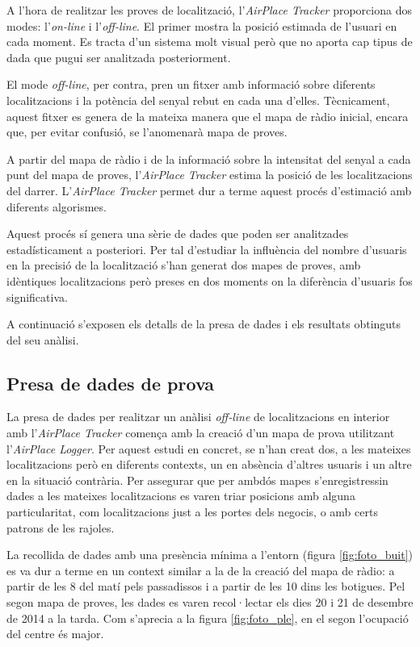 
A l'hora de realitzar les proves de localització, l'\textit{AirPlace Tracker} proporciona dos modes: l'\textit{on-line} i l'\textit{off-line}. El primer mostra la posició estimada de l'usuari en cada moment. Es tracta d'un sistema molt visual però que no aporta cap tipus de dada que pugui ser analitzada posteriorment.

El mode \textit{off-line}, per contra, pren un fitxer amb informació sobre diferents localitzacions i la potència del senyal rebut en cada una d'elles. Tècnicament, aquest fitxer es genera de la mateixa manera que el mapa de ràdio inicial, encara que, per evitar confusió, se l'anomenarà mapa de proves.

A partir del mapa de ràdio i de la informació sobre la intensitat del senyal a cada punt del mapa de proves, l'\textit{AirPlace Tracker} estima la posició de les localitzacions del darrer. L'\textit{AirPlace Tracker} permet dur a terme aquest procés d'estimació amb diferents algorismes.

Aquest procés sí genera una sèrie de dades que poden ser analitzades estadísticament a posteriori. Per tal d'estudiar la influència del nombre d'usuaris en la precisió de la localització s'han generat dos mapes de proves, amb idèntiques localitzacions però preses en dos moments on la diferència d'usuaris fos significativa.

A continuació s'exposen els detalls de la presa de dades i els resultats obtinguts del seu anàlisi.

\subsection{Presa de dades de prova}

La presa de dades per realitzar un anàlisi \textit{off-line} de localitzacions en interior amb l'\textit{AirPlace Tracker} comença amb la creació d'un mapa de prova utilitzant l'\textit{AirPlace Logger}. Per aquest estudi en concret, se n'han creat dos, a les mateixes localitzacions però en diferents contexts, un en absència d'altres usuaris i un altre en la situació contrària. Per assegurar que per ambdós mapes s'enregistressin dades a les mateixes localitzacions es varen triar posicions amb alguna particularitat, com localitzacions just a les portes dels negocis, o amb certs patrons de les rajoles.

La recollida de dades amb una presència mínima a l'entorn (figura \ref{fig:foto_buit}) es va dur a terme en un context similar a la de la creació del mapa de ràdio: a partir de les 8 del matí pels passadissos i a partir de les 10 dins les botigues. Pel segon mapa de proves, les dades es varen recol·lectar els dies 20 i 21 de desembre de 2014 a la tarda. Com s'aprecia a la figura \ref{fig:foto_ple}, en el segon l'ocupació del centre és major.

